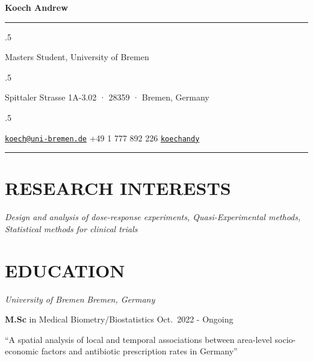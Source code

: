 \documentclass[13pt,]{article}
\providecommand{\tightlist}{%
  \setlength{\itemsep}{0pt}\setlength{\parskip}{0pt}}
\renewenvironment{itemize}{
  \begin{list}{}{
    \setlength{\leftmargin}{1.5em}
  }
}{
  \end{list}
}
\begin{document}
\centerline{\huge \bf Koech Andrew}

\vspace{2 mm}

\hrule

\vspace{2 mm}

\moveleft.5\hoffset\centerline{Masters Student, University of Bremen}
\moveleft.5\hoffset\centerline{Spittaler Strasse 1A-3.02 · 28359 ·
Bremen, Germany}
\moveleft.5\hoffset\centerline{ \faEnvelopeO \hspace{1 mm} \href{mailto:}{\tt \href{mailto:koech@uni-bremen.de}{\nolinkurl{koech@uni-bremen.de}}} \hspace{1 mm}  \faPhone \hspace{1 mm}  +49
1 777 892
226  \hspace{1 mm}  \faGithub \hspace{1 mm} \href{http://github.com/koechandy}{\tt koechandy} \hspace{1 mm}      } 

\vspace{2 mm}

\hrule


\section{\texorpdfstring{\textbf{RESEARCH
INTERESTS}}{RESEARCH INTERESTS}}\label{research-interests}

\begin{itemize}
\tightlist
\item
  \emph{Design and analysis of dose-response experiments,
  Quasi-Experimental methods, Statistical methods for clinical trials}
\end{itemize}

\section{\texorpdfstring{\textbf{EDUCATION}}{EDUCATION}}\label{education}

\emph{University of Bremen} \hfill \emph{Bremen, Germany}

\begin{itemize}
\item
  \textbf{M.Sc} in Medical Biometry/Biostatistics \hfill Oct.~2022 -
  Ongoing

  \begin{itemize}
  \tightlist
  \item
    ``A spatial analysis of local and temporal associations between
    area-level socio-economic factors and antibiotic prescription rates
    in Germany''
  \end{itemize}
\end{itemize}
\end{document}
